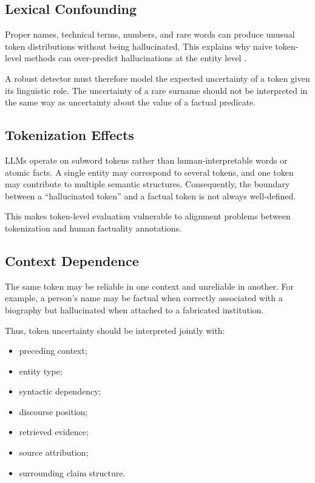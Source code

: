 \documentclass[11pt]{article}
\begin{document}
\subsection{Lexical Confounding}
\label{sec:lexical-confounding}

Proper names, technical terms, numbers, and rare words can produce unusual token distributions without being hallucinated. This explains why naive token-level methods can over-predict hallucinations at the entity level \cite{yeh2025}.

A robust detector must therefore model the expected uncertainty of a token given its linguistic role. The uncertainty of a rare surname should not be interpreted in the same way as uncertainty about the value of a factual predicate.

\subsection{Tokenization Effects}
\label{sec:tokenization}

LLMs operate on subword tokens rather than human-interpretable words or atomic facts. A single entity may correspond to several tokens, and one token may contribute to multiple semantic structures. Consequently, the boundary between a ``hallucinated token'' and a factual token is not always well-defined.

This makes token-level evaluation vulnerable to alignment problems between tokenization and human factuality annotations.

\subsection{Context Dependence}
\label{sec:context-dependence}

The same token may be reliable in one context and unreliable in another. For example, a person's name may be factual when correctly associated with a biography but hallucinated when attached to a fabricated institution.

Thus, token uncertainty should be interpreted jointly with:

\begin{itemize}
    \item preceding context;
    \item entity type;
    \item syntactic dependency;
    \item discourse position;
    \item retrieved evidence;
    \item source attribution;
    \item surrounding claim structure.
\end{itemize}
\end{document}
